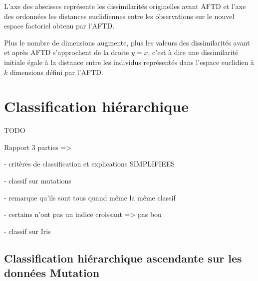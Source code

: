\documentclass[a4paper,10pt]{report}
\begin{document}
L'axe des abscisses représente les dissimilarités originelles avant AFTD et l'axe des ordonnées les distances euclidiennes entre les observations sur le nouvel espace factoriel obtenu par l'AFTD.

Plus le nombre de dimensions augmente, plus les valeurs des dissimilarités avant et après AFTD s'approchent de la droite $y = x$, c'est à dire une dissimilarité initiale égale à la distance entre les individus représentés dans l'espace euclidien à $k$ dimensions défini par l'AFTD.







\chapter{Classification hiérarchique}



TODO

Rapport 3 parties =>

     - critères de classification et explications SIMPLIFIEES
     
     - classif sur mutations
     
              - remarque qu'ils sont tous quand même la même classif
              
              - certains n'ont pas un indice croissant => pas bon
              
     - classif sur Iris


\section{Classification hiérarchique ascendante sur les données Mutation}
\end{document}
